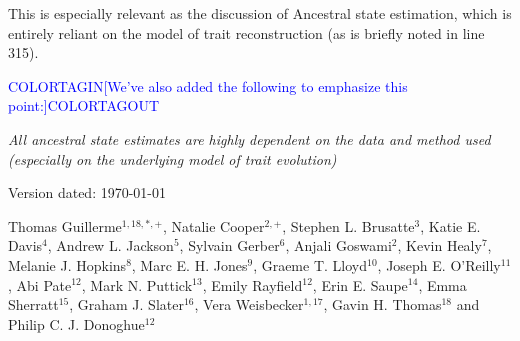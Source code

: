 \documentclass[12pt,letterpaper]{article}
\begin{document}
\noindent This is especially relevant as the discussion of Ancestral state estimation, which is entirely reliant on the model of trait reconstruction (as is briefly noted in line 315).

\textcolor{blue}{COLORTAGIN[We've also added the following to emphasize this point:]COLORTAGOUT}

\textit{All ancestral state estimates are highly dependent on the data and method used (especially on the underlying model of trait evolution)}

\begin{flushright}
Version dated: \today
\end{flushright}

\medskip
\begin{center}
\bigskip

Thomas Guillerme$^{1,18,*, +}$,
Natalie Cooper$^{2, +}$,
Stephen L. Brusatte$^{3}$,
Katie E. Davis$^{4}$,
Andrew L. Jackson$^{5}$,
Sylvain Gerber$^{6}$,
Anjali Goswami$^{2}$,
Kevin Healy$^{7}$,
Melanie J. Hopkins$^{8}$,
Marc E. H. Jones$^{9}$,
Graeme T. Lloyd$^{10}$,
Joseph E. O'Reilly$^{11}$, %
Abi Pate$^{12}$,
Mark N. Puttick$^{13}$,
Emily Rayfield$^{12}$,
Erin E. Saupe$^{14}$,
Emma Sherratt$^{15}$,
Graham J. Slater$^{16}$,
Vera Weisbecker$^{1,17}$,
Gavin H. Thomas$^{18}$
and Philip C. J. Donoghue$^{12}$



\end{center}
\end{document}
